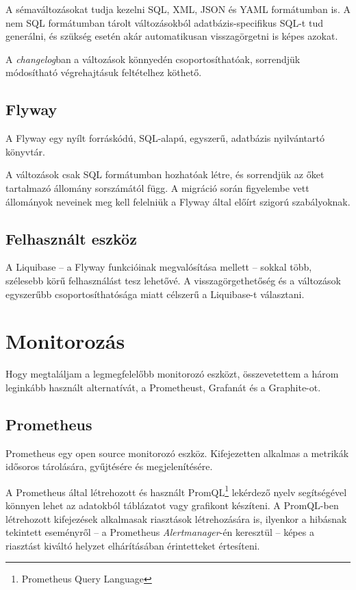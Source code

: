 A sémaváltozásokat tudja kezelni SQL, XML, JSON és YAML formátumban is. A nem SQL formátumban tárolt változásokból adatbázis-specifikus SQL-t tud generálni, és szükség esetén akár automatikusan visszagörgetni is képes azokat.

A \textit{changelog}ban a változások könnyedén csoportosíthatóak, sorrendjük módosítható végrehajtásuk feltételhez köthető.


\subsection{Flyway}
A Flyway egy nyílt forráskódú, SQL-alapú, egyszerű, adatbázis nyilvántartó könyvtár.

A változások csak SQL formátumban hozhatóak létre, és sorrendjük az őket tartalmazó állomány sorszámától függ. A migráció során figyelembe vett állományok neveinek meg kell felelniük a Flyway által előírt szigorú szabályoknak.


\subsection{Felhasznált eszköz}
A Liquibase --  a Flyway funkcióinak megvalósítása mellett --   sokkal több, szélesebb körű felhasználást tesz lehetővé. A visszagörgethetőség és a változások egyszerűbb csoportosíthatósága miatt célszerű a Liquibase-t választani.




\section{Monitorozás}\label{sec:metrikak_tervezes}
Hogy megtaláljam a legmegfelelőbb monitorozó eszközt, összevetettem a három leginkább használt alternatívát, a Prometheust, Grafanát és a Graphite-ot.

\subsection{Prometheus}
Prometheus egy open source monitorozó eszköz. Kifejezetten alkalmas a metrikák idősoros tárolására, gyűjtésére és megjelenítésére.

A Prometheus által létrehozott és használt PromQL\footnote{Prometheus Query Language} lekérdező nyelv segítségével könnyen lehet az adatokból táblázatot vagy grafikont készíteni. A PromQL-ben létrehozott kifejezések alkalmasak riasztások létrehozására is, ilyenkor a hibásnak tekintett eseményről --  a Prometheus \textit{Alertmanager}-én keresztül --   képes a riasztást kiváltó helyzet elhárításában érintetteket értesíteni.

